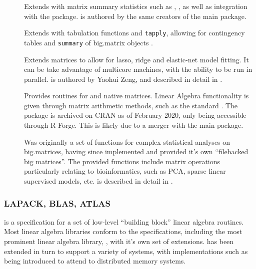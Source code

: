 \begin{description}
    \item[]
        Extends  with matrix summary statistics such as
        , , as well as integration with the 
        package\cite{emerson16}.  is authored by the same creators
        of the main  package.
    \item[]
        Extends  with tabulation functions and \texttt{tapply},
        allowing for contingency tables and \texttt{summary} of big.matrix
        objects \cite{kane16}.
    \item[]
        Extends  matrices to allow for lasso, ridge and elastic-net
        model fitting. It can be take advantage of multicore machines, with the
        ability to be run in parallel.  is authored by Yaohui Zeng, and
        described in detail in \textcite{zeng2017biglasso}.
    \item[]
        Provides  routines for  and native \R matrices. Linear
        Algebra functionality is given through matrix arithmetic methods, such
        as the standard . The package is archived
        on CRAN as of February 2020, only being accessible through R-Forge. This
        is likely due to a merger with the main  package.
    \item[]
        Was originally a set of functions for complex statistical analyses on
        big.matrices, having since implemented and provided it's own
        ``filebacked big matrices''\cite{prive2018efficient}. The provided
        functions include matrix operations particularly relating to
        bioinformatics, such as PCA, sparse linear supervised models, etc.
         is described in detail in \textcite{prive2018efficient}.
\end{description}

\subsubsection{LAPACK, BLAS, ATLAS}\label{subsec:blas-lapack}

 is a specification for a set of low-level ``building block'' linear
algebra routines\cite{lawson1979basic}. Most linear algebra libraries
conform to the  specifications, including the most prominent linear
algebra library, , with it's own set of
extensions\cite{demmel1989lapack}.  has been extended in turn to
support a variety of systems, with implementations such as 
being introduced to attend to distributed memory
systems\cite{choi1992scalapack}.

